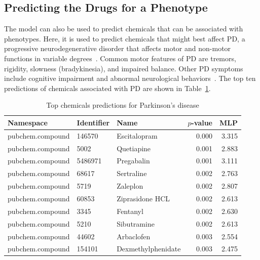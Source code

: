 \subsection{Predicting the Drugs for a Phenotype}

The model can also be used to predict chemicals that can be associated with phenotypes.
Here, it is used to predict chemicals that might best affect \ac{PD}, a progressive neurodegenerative disorder that affects motor and non-motor functions in variable degrees~\cite{jankovic_parkinsons_2008}.
Common motor features of \ac{PD} are tremors, rigidity, slowness (bradykinesia), and impaired balance.
Other \ac{PD} symptoms include cognitive impairment and abnormal neurological behaviors~\cite{jankovic_parkinsons_2008}.
The top ten predictions of chemicals associated with \ac{PD} are shown in Table~\ref{tab:phenotype_drug}.

\begin{table}[h]
    \centering
    \begin{tabular}{|l|l|l|r|r|}
        \hline
        \textbf{Namespace} & \textbf{Identifier} & \textbf{Name} & \textbf{$p$-value} & \textbf{MLP} \\
        \hline
        pubchem.compound & 146570 & Escitalopram & 0.000 & 3.315 \\
        \hline
        pubchem.compound & 5002 & Quetiapine & 0.001 & 2.883 \\
        \hline
        pubchem.compound & 5486971 & Pregabalin & 0.001 & 3.111 \\
        \hline
        pubchem.compound & 68617 & Sertraline & 0.002 & 2.763 \\
        \hline
        pubchem.compound & 5719 & Zaleplon & 0.002 & 2.807 \\
        \hline
        pubchem.compound & 60853 & Ziprasidone HCL & 0.002 & 2.613 \\
        \hline
        pubchem.compound & 3345 & Fentanyl & 0.002 & 2.630 \\
        \hline
        pubchem.compound & 5210 & Sibutramine & 0.002 & 2.613 \\
        \hline
        pubchem.compound & 44602 & Arbaclofen & 0.003 & 2.554 \\
        \hline
        pubchem.compound & 154101 & Dexmethylphenidate & 0.003 & 2.475 \\
        \hline
    \end{tabular}
    \caption{Top chemicals predictions for Parkinson's disease}
    \label{tab:phenotype_drug}
\end{table}

